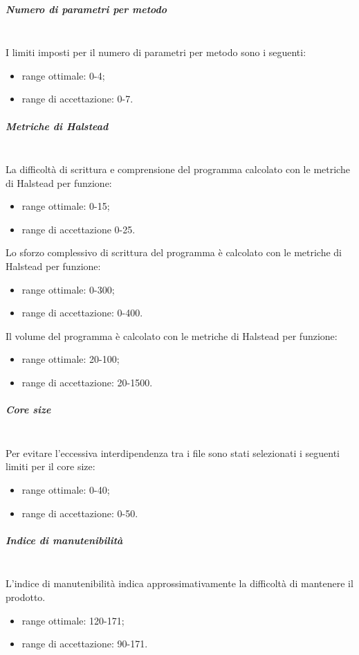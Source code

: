 \subparagraph{Numero di parametri per metodo}\mbox{}\\
I limiti imposti per il numero di parametri per metodo sono i seguenti:
\begin{itemize}
	\item range ottimale: 0-4;
	\item range di accettazione: 0-7.
\end{itemize}

\subparagraph{Metriche di Halstead}\mbox{}\\
La difficoltà di scrittura e comprensione del programma calcolato con le metriche di Halstead per funzione:
\begin{itemize}
	\item range ottimale: 0-15;
	\item range di accettazione 0-25.
\end{itemize}

Lo sforzo complessivo di scrittura del programma è calcolato con le metriche di Halstead per funzione:
\begin{itemize}
	\item range ottimale: 0-300;
	\item range di accettazione: 0-400.
\end{itemize}

Il volume del programma è calcolato con le metriche di Halstead per funzione:
\begin{itemize}
	\item range ottimale: 20-100;
	\item range di accettazione: 20-1500.
\end{itemize}

\subparagraph{Core size}\mbox{}\\
Per evitare l'eccessiva interdipendenza tra i file sono stati selezionati i seguenti limiti per il core size:
\begin{itemize}
	\item range ottimale: 0-40;
	\item range di accettazione: 0-50.
\end{itemize}

\subparagraph{Indice di manutenibilità}\mbox{}\\
L'indice di manutenibilità indica approssimativamente la difficoltà di mantenere il prodotto.
\begin{itemize}
	\item range ottimale: 120-171;
	\item range di accettazione: 90-171.
\end{itemize}

